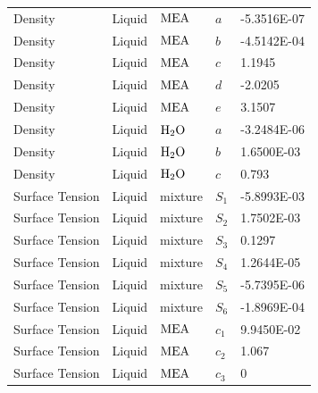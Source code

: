 \documentclass[a4paper,fleqn]{cas-sc}
\begin{document}
\begin{longtable}{lllll}
        Density                   & Liquid         & $\ce{MEA}$          & $a$               & -5.3516E-07    \\
        Density                   & Liquid         & $\ce{MEA}$          & $b$               & -4.5142E-04    \\
        Density                   & Liquid         & $\ce{MEA}$          & $c$               & 1.1945         \\
        Density                   & Liquid         & $\ce{MEA}$          & $d$               & -2.0205        \\
        Density                   & Liquid         & $\ce{MEA}$          & $e$               & 3.1507         \\
        Density                   & Liquid         & $\ce{H2O}$          & $a$               & -3.2484E-06    \\
        Density                   & Liquid         & $\ce{H2O}$          & $b$               & 1.6500E-03     \\
        Density                   & Liquid         & $\ce{H2O}$          & $c$               & 0.793          \\
        Surface Tension           & Liquid         & mixture             & $S_1$             & -5.8993E-03    \\
        Surface Tension           & Liquid         & mixture             & $S_2$             & 1.7502E-03     \\
        Surface Tension           & Liquid         & mixture             & $S_3$             & 0.1297         \\
        Surface Tension           & Liquid         & mixture             & $S_4$             & 1.2644E-05     \\
        Surface Tension           & Liquid         & mixture             & $S_5$             & -5.7395E-06    \\
        Surface Tension           & Liquid         & mixture             & $S_6$             & -1.8969E-04    \\
        Surface Tension           & Liquid         & $\ce{MEA}$          & $c_1$             & 9.9450E-02     \\
        Surface Tension           & Liquid         & $\ce{MEA}$          & $c_2$             & 1.067          \\
        Surface Tension           & Liquid         & $\ce{MEA}$          & $c_3$             & 0              \\

\end{longtable}
\end{document}

